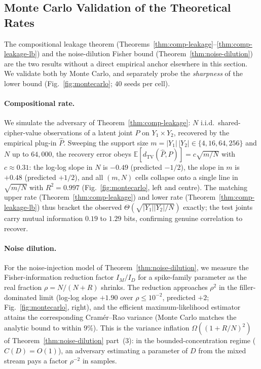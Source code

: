 \documentclass[conference]{IEEEtran}
\theoremstyle{definition}
\theoremstyle{plain}
\theoremstyle{remark}
\newcommand{\TV}{d_{\mathrm{TV}}}
\begin{document}
\subsection{Monte Carlo Validation of the Theoretical Rates}
\label{subsec:montecarlo}

The compositional leakage theorem
(Theorems~\ref{thm:comp-leakage}--\ref{thm:comp-leakage-lb}) and the
noise-dilution Fisher bound (Theorem~\ref{thm:noise-dilution}) are the
two results without a direct empirical anchor elsewhere in this
section.  We validate both by Monte Carlo, and separately probe the
\emph{sharpness} of the lower bound
(Fig.~\ref{fig:montecarlo}; $40$ seeds per cell).

\paragraph{Compositional rate.}
We simulate the adversary of Theorem~\ref{thm:comp-leakage}:
$N$ i.i.d.\ shared-cipher-value observations of a latent joint $P$ on
$Y_1 \times Y_2$, recovered by the empirical plug-in $\hat P$.  Sweeping
the support size $m = |Y_1|\,|Y_2| \in \{4, 16, 64, 256\}$ and
$N$ up to $64{,}000$, the recovery error obeys
$\mathbb{E}[\TV(\hat P, P)] = c\sqrt{m/N}$ with $c \approx 0.31$: the
log-log slope in $N$ is $-0.49$ (predicted $-1/2$), the slope in $m$ is
$+0.48$ (predicted $+1/2$), and all $(m, N)$ cells collapse onto a
single line in $\sqrt{m/N}$ with $R^2 = 0.997$
(Fig.~\ref{fig:montecarlo}, left and centre).  The matching upper rate
(Theorem~\ref{thm:comp-leakage}) and lower rate
(Theorem~\ref{thm:comp-leakage-lb}) thus bracket the observed
$\Theta(\sqrt{|Y_1||Y_2|/N})$ exactly; the test joints carry mutual
information $0.19$ to $1.29$ bits, confirming genuine correlation to
recover.

\paragraph{Noise dilution.}
For the noise-injection model of Theorem~\ref{thm:noise-dilution}, we
measure the Fisher-information reduction factor $I_M/I_D$ for a
spike-family parameter as the real fraction $\rho = N/(N{+}R)$ shrinks.
The reduction approaches $\rho^2$ in the filler-dominated limit
(log-log slope $+1.90$ over $\rho \leq 10^{-2}$, predicted $+2$;
Fig.~\ref{fig:montecarlo}, right), and the efficient maximum-likelihood
estimator attains the corresponding Cram\'er--Rao variance (Monte Carlo
matches the analytic bound to within $9\%$).  This is the variance
inflation $\Omega((1 + R/N)^2)$ of Theorem~\ref{thm:noise-dilution}
part~(3): in the bounded-concentration regime ($C(D) = O(1)$), an
adversary estimating a parameter of $D$ from the mixed stream pays a
factor $\rho^{-2}$ in samples.
\end{document}
